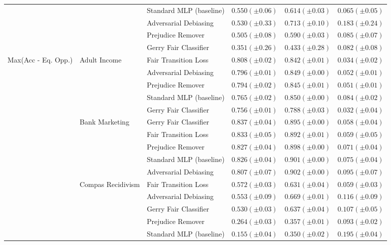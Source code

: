 \begin{tabular}{llllll}
 &  & Standard MLP (baseline) & $0.550 (\pm0.06)$ & $0.614 (\pm0.03)$ & $0.065 (\pm0.05)$ \\
 &  & Adversarial Debiasing & $0.530 (\pm0.33)$ & $0.713 (\pm0.10)$ & $0.183 (\pm0.24)$ \\
 &  & Prejudice Remover & $0.505 (\pm0.08)$ & $0.590 (\pm0.03)$ & $0.085 (\pm0.07)$ \\
 &  & Gerry Fair Classifier & $0.351 (\pm0.26)$ & $0.433 (\pm0.28)$ & $0.082 (\pm0.08)$ \\
\cline{1-6} \cline{2-6}
\multirow[t]{20}{*}{Max(Acc - Eq. Opp.)} & \multirow[t]{5}{*}{Adult Income} & Fair Transition Loss & $0.808 (\pm0.02)$ & $0.842 (\pm0.01)$ & $0.034 (\pm0.02)$ \\
 &  & Adversarial Debiasing & $0.796 (\pm0.01)$ & $0.849 (\pm0.00)$ & $0.052 (\pm0.01)$ \\
 &  & Prejudice Remover & $0.794 (\pm0.02)$ & $0.845 (\pm0.01)$ & $0.051 (\pm0.01)$ \\
 &  & Standard MLP (baseline) & $0.765 (\pm0.02)$ & $0.850 (\pm0.00)$ & $0.084 (\pm0.02)$ \\
 &  & Gerry Fair Classifier & $0.756 (\pm0.01)$ & $0.788 (\pm0.03)$ & $0.032 (\pm0.04)$ \\
\cline{2-6}
 & \multirow[t]{5}{*}{Bank Marketing} & Gerry Fair Classifier & $0.837 (\pm0.04)$ & $0.895 (\pm0.00)$ & $0.058 (\pm0.04)$ \\
 &  & Fair Transition Loss & $0.833 (\pm0.05)$ & $0.892 (\pm0.01)$ & $0.059 (\pm0.05)$ \\
 &  & Prejudice Remover & $0.827 (\pm0.04)$ & $0.898 (\pm0.00)$ & $0.071 (\pm0.04)$ \\
 &  & Standard MLP (baseline) & $0.826 (\pm0.04)$ & $0.901 (\pm0.00)$ & $0.075 (\pm0.04)$ \\
 &  & Adversarial Debiasing & $0.807 (\pm0.07)$ & $0.902 (\pm0.00)$ & $0.095 (\pm0.07)$ \\
\cline{2-6}
 & \multirow[t]{5}{*}{Compas Recidivism} & Fair Transition Loss & $0.572 (\pm0.03)$ & $0.631 (\pm0.04)$ & $0.059 (\pm0.03)$ \\
 &  & Adversarial Debiasing & $0.553 (\pm0.09)$ & $0.669 (\pm0.01)$ & $0.116 (\pm0.09)$ \\
 &  & Gerry Fair Classifier & $0.530 (\pm0.03)$ & $0.637 (\pm0.04)$ & $0.107 (\pm0.05)$ \\
 &  & Prejudice Remover & $0.264 (\pm0.03)$ & $0.357 (\pm0.01)$ & $0.093 (\pm0.02)$ \\
 &  & Standard MLP (baseline) & $0.155 (\pm0.04)$ & $0.350 (\pm0.02)$ & $0.195 (\pm0.04)$ \\

\end{tabular}
